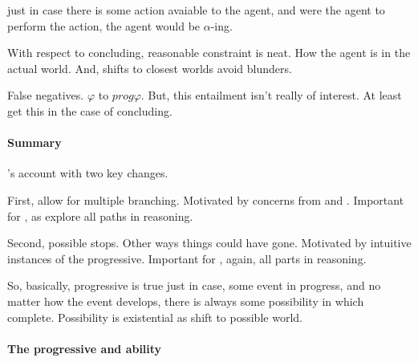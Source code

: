 \begin{note}
  \pevent{} just in case there is some action avaiable to the agent, and were the agent to perform the action, the agent would be \(\alpha\)-ing.
\end{note}

\begin{note}
  With respect to concluding, reasonable constraint is neat.
  How the agent is in the actual world.
  And, shifts to closest worlds avoid blunders.
\end{note}

\begin{note}
  False negatives.
  \(\varphi\) to \(prog \varphi\).
  But, this entailment isn't really of interest.
  At least get this in the case of concluding.
\end{note}

\paragraph{Summary}

\begin{note}
  \citeauthor{Landman:1992wh}'s account with two key changes.

  First, allow for multiple branching.
  Motivated by concerns from \citeauthor{Bonomi:1997uq} and \citeauthor{Szabo:2004ul}.
  Important for , as explore all paths in reasoning.

  Second, possible stops.
  Other ways things could have gone.
  Motivated by intuitive instances of the progressive.
  Important for , again, all parts in reasoning.

  So, basically, progressive is true just in case, some event in progress, and no matter how the event develops, there is always some possibility in which complete.
  Possibility is existential as shift to possible world.
\end{note}

\paragraph{The progressive and ability}

